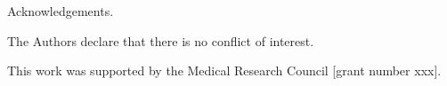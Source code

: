 \documentclass[sagev, Crown]{sagej}
\begin{document}
\begin{acks}
Acknowledgements.
\end{acks}

\begin{dci}
The Authors declare that there is no conflict of interest.
\end{dci}

\begin{funding}
This work was supported by the Medical Research Council [grant number xxx].
\end{funding}



\end{document}

